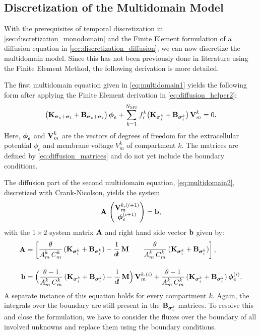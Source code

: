 \subsection{Discretization of the Multidomain Model}\label{sec:discretization_multidomain}
With the prerequisites of temporal discretization in \cref{sec:discretization_monodomain} and the Finite Element formulation of a diffusion equation in \cref{sec:discretization_diffusion}, we can now discretize the multidomain model. Since this has not been previously done in literature using the Finite Element Method, the following derivation is more detailed.

The first multidomain equation given in \cref{eq:multidomain1} yields the following form after applying the Finite Element derivation in \cref{eq:diffusion_helper2}:
%
\begin{align}\label{eq:multidomain_discretization_helper_multidomain1}
  \big(\textbf{K}_{\boldsymbol{\sigma}_e + \boldsymbol{\sigma}_i} + \textbf{B}_{\boldsymbol{\sigma}_e + \boldsymbol{\sigma}_i}\big)\,\boldsymbol{\phi}_{e} +  \displaystyle\sum\limits_{k=1}^{N_\text{MU}} f_r^k \big(\textbf{K}_{\boldsymbol{\sigma}_i^k} + \textbf{B}_{\boldsymbol{\sigma}_i^k}\big)\,\textbf{V}_m^k = 0.  
\end{align}
Here, $\boldsymbol{\phi}_{e}$ and $\textbf{V}_m^k$ are the vectors of degrees of freedom for the extracellular potential $\phi_e$ and membrane voltage $V_m^k$ of compartment $k$. The matrices are defined by \cref{eq:diffusion_matrices} and do not yet include the boundary conditions.

The diffusion part of the second multidomain equation, \cref{eq:multidomain2}, discretized with Crank-Nicolson, yields the system%
\begin{align}\label{eq:multidomain_discretization_helper_multidomain2}
  \textbf{A}\,\left(\begin{matrix}\textbf{V}_m^{k,(i+1)}\\ \boldsymbol{\phi}_{e}^{(i+1)}\end{matrix}\right) = \textbf{b},  
\end{align}
%
with the $1 \times 2$ system matrix $\textbf{A}$ and right hand side vector $\textbf{b}$ given by:%
\begin{subequations}\label{eq:multidomain_discretization_helper_multidomain3}
\begin{align}
   \bfA &= \matt{
      \dfrac{\theta}{A_m^k\,C_m^k}(\bfK_{\bfsigma_i^k} + \bfB_{\bfsigma_i^k}) -\dfrac{1}{\dt}\bfM & \quad
      \dfrac{\theta}{A_m^k\,C_m^k}(\bfK_{\bfsigma_i^k} + \bfB_{\bfsigma_i^k})
    }, \\[4mm]
    \bfb &= \Big( \dfrac{\theta-1}{A_m^k\,C_m^k}(\bfK_{\bfsigma_i^k} + \bfB_{\bfsigma_i^k}) - \dfrac{1}{\dt}\bfM\Big)\,\bfV_m^{k,(i)} 
      + \dfrac{\theta - 1}{A_m^k\,C_m^k}(\bfK_{\bfsigma_i^k} + \bfB_{\bfsigma_i^k})\,\bfphi_e^{(i)}.
\end{align}
\end{subequations}
%
A separate instance of this equation holds for every compartment $k$. Again, the integrals over the boundary are still present in the $\textbf{B}_{\boldsymbol{\sigma}_i^k}$ matrices.
To resolve this and close the formulation, we have to consider the fluxes over the boundary of all involved unknowns and replace them using the boundary conditions.

